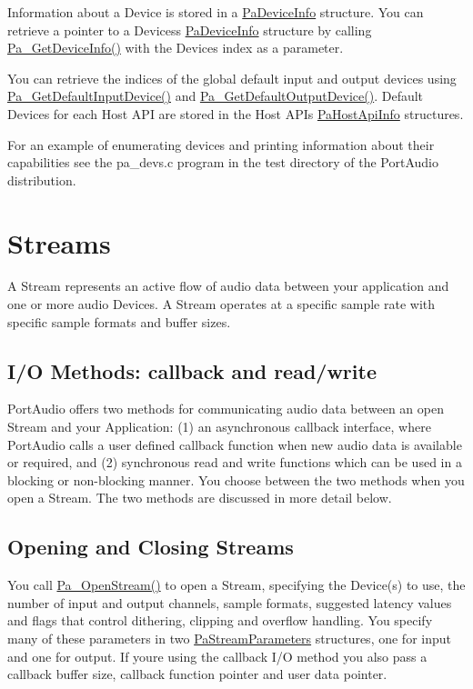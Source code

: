 Information about a Device is stored in a \hyperlink{struct_pa_device_info}{Pa\+Device\+Info} structure. You can retrieve a pointer to a Devices\textquotesingle{}s \hyperlink{struct_pa_device_info}{Pa\+Device\+Info} structure by calling \hyperlink{portaudio_8h_ac7d8e091ffc1d1d4a035704660e117eb}{Pa\+\_\+\+Get\+Device\+Info()} with the Device\textquotesingle{}s index as a parameter.

You can retrieve the indices of the global default input and output devices using \hyperlink{portaudio_8h_abf9f2f82da95553d5adb929af670f74b}{Pa\+\_\+\+Get\+Default\+Input\+Device()} and \hyperlink{portaudio_8h_adc955dfab007624000695c48d4f876dc}{Pa\+\_\+\+Get\+Default\+Output\+Device()}. Default Devices for each Host A\+PI are stored in the Host A\+PI\textquotesingle{}s \hyperlink{struct_pa_host_api_info}{Pa\+Host\+Api\+Info} structures.

For an example of enumerating devices and printing information about their capabilities see the pa\+\_\+devs.\+c program in the test directory of the Port\+Audio distribution.\hypertarget{api_overview_streams}{}\section{Streams}\label{api_overview_streams}
A Stream represents an active flow of audio data between your application and one or more audio Devices. A Stream operates at a specific sample rate with specific sample formats and buffer sizes.\hypertarget{api_overview_io_methods}{}\subsection{I/\+O Methods\+: callback and read/write}\label{api_overview_io_methods}
Port\+Audio offers two methods for communicating audio data between an open Stream and your Application\+: (1) an asynchronous callback interface, where Port\+Audio calls a user defined callback function when new audio data is available or required, and (2) synchronous read and write functions which can be used in a blocking or non-\/blocking manner. You choose between the two methods when you open a Stream. The two methods are discussed in more detail below.\hypertarget{api_overview_opening_and_closing_streams}{}\subsection{Opening and Closing Streams}\label{api_overview_opening_and_closing_streams}
You call \hyperlink{portaudio_8h_a443ad16338191af364e3be988014cbbe}{Pa\+\_\+\+Open\+Stream()} to open a Stream, specifying the Device(s) to use, the number of input and output channels, sample formats, suggested latency values and flags that control dithering, clipping and overflow handling. You specify many of these parameters in two \hyperlink{struct_pa_stream_parameters}{Pa\+Stream\+Parameters} structures, one for input and one for output. If you\textquotesingle{}re using the callback I/O method you also pass a callback buffer size, callback function pointer and user data pointer.

